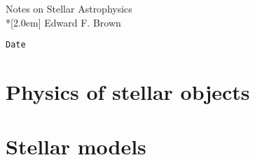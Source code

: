 \documentclass[11pt]{book}
\begin{document}
\newcommand{\thetitle}{Notes on Stellar Astrophysics}
\newcommand{\theauthor}{Edward F. Brown}

\begin{titlepage}
\vspace*{2.5in}
\begin{center}
\LARGE{\thetitle}\\*[2.0em]
\large{\theauthor}
\end{center}
\vspace*{3.0in}
\small{\verb$Date$}
\end{titlepage}

\tableofcontents

\part{Physics of stellar objects}






\part{Stellar models}






\appendix



\end{document}
